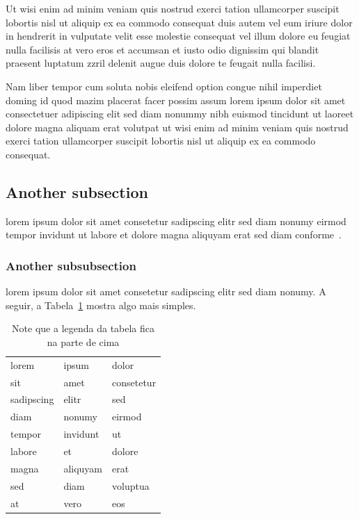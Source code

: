 Ut wisi enim ad minim veniam quis nostrud exerci tation
ullamcorper suscipit lobortis nisl ut aliquip ex ea commodo
consequat duis autem vel eum iriure dolor in hendrerit in
vulputate velit esse molestie consequat vel illum dolore eu
feugiat nulla facilisis at vero eros et accumsan et iusto odio
dignissim qui blandit praesent luptatum zzril delenit augue duis
dolore te feugait nulla facilisi.

Nam liber tempor cum soluta nobis eleifend option congue nihil
imperdiet doming id quod mazim placerat facer possim assum lorem
ipsum dolor sit amet consectetuer adipiscing elit sed diam nonummy
nibh euismod tincidunt ut laoreet dolore magna aliquam erat
volutpat ut wisi enim ad minim veniam quis nostrud exerci tation
ullamcorper suscipit lobortis nisl ut aliquip ex ea commodo
consequat.

\subsection{Another subsection}

lorem ipsum dolor sit amet consetetur sadipscing elitr sed diam
nonumy eirmod tempor invidunt ut labore et dolore magna aliquyam
erat sed diam conforme~.

\subsubsection{Another subsubsection}

lorem ipsum dolor sit amet consetetur sadipscing elitr sed diam
nonumy. A seguir, a Tabela~\ref{tab:tab2} mostra algo mais
simples.

\begin{table}
\begin{center}%
\caption{Note que a legenda da tabela fica na parte de cima}%
\begin{tabular*}{.7\linewidth}{@{\extracolsep{\fill}}lll}%
\noalign{\smallskip}
\hline
lorem & ipsum & dolor \tabularnewline
sit & amet & consetetur \tabularnewline
sadipscing & elitr & sed \tabularnewline
diam & nonumy & eirmod \tabularnewline
tempor & invidunt & ut \tabularnewline
labore & et & dolore \tabularnewline
magna & aliquyam & erat \tabularnewline
sed & diam & voluptua \tabularnewline
at & vero & eos \tabularnewline
\end{tabular*}
\end{center}
\label{tab:tab2}
\end{table}

